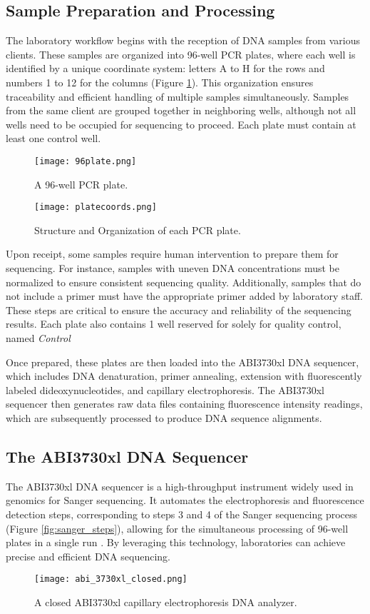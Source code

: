 \subsection{Sample Preparation and Processing}
The laboratory workflow begins with the reception of DNA samples from various clients. These samples are organized into 96-well PCR plates, where each well is identified by a unique coordinate system: letters A to H for the rows and numbers 1 to 12 for the columns (Figure \ref{fig:96_well_plate}). This organization ensures traceability and efficient handling of multiple samples simultaneously. Samples from the same client are grouped together in neighboring wells, although not all wells need to be occupied for sequencing to proceed. Each plate must contain at least one control well.
\begin{figure}[H]
  \centering
  \texttt{[image: 96plate.png]}
  \caption{A 96-well PCR plate.}
  \label{fig:96_well_plate}
\end{figure}


\begin{figure}[H]
  \centering
  \texttt{[image: platecoords.png]}
  \caption{Structure and Organization of each PCR plate.}
  \label{fig:platecoords}
\end{figure}

Upon receipt, some samples require human intervention to prepare them for sequencing. For instance, samples with uneven DNA concentrations must be normalized to ensure consistent sequencing quality. Additionally, samples that do not include a primer must have the appropriate primer added by laboratory staff. These steps are critical to ensure the accuracy and reliability of the sequencing results. Each plate also contains 1 well reserved for solely for quality control, named \textit{Control}

Once prepared, these plates are then loaded into the ABI3730xl DNA sequencer, which includes DNA denaturation, primer annealing, extension with fluorescently labeled dideoxynucleotides, and capillary electrophoresis. The ABI3730xl sequencer then generates raw data files containing fluorescence intensity readings, which are subsequently processed to produce DNA sequence alignments.


\subsection{The ABI3730xl DNA Sequencer}
The ABI3730xl DNA sequencer is a high-throughput instrument widely used in genomics for Sanger sequencing. It automates the electrophoresis and fluorescence detection steps, corresponding to steps 3 and 4 of the Sanger sequencing process (Figure \ref{fig:sanger_steps}), allowing for the simultaneous processing of 96-well plates in a single run \cite{smith_capillary_sequencing,abi3730xl_overview}. By leveraging this technology, laboratories can achieve precise and efficient DNA sequencing. 
\begin{figure}[h]
\centering
\texttt{[image: abi\_3730xl\_closed.png]}
\caption{A closed ABI3730xl capillary electrophoresis DNA analyzer.}
\label{fig:abi_3730xl_closed}
\end{figure}

